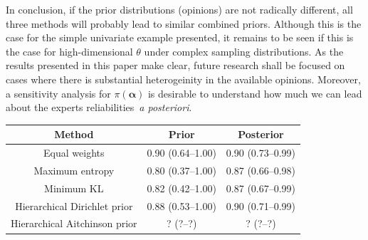 \documentclass[a4paper, notitlepage, 10pt]{article}
\begin{document}
In conclusion, if the prior distributions (opinions) are not radically different, all three methods will probably lead to similar combined priors.
Although this is the case for the simple univariate example presented, it remains to be seen if this is the case for high-dimensional $\theta$ under complex sampling distributions.
As the results presented in this paper make clear, future research shall be focused on cases where there is substantial heterogeinity in the available opinions.
Moreover, a sensitivity analysis for $\pi(\boldsymbol\alpha)$ is desirable to understand how much we can lead about the experts reliabilities~\textit{a posteriori}.



\begin{table}[ht]
\centering
\begin{tabular}{ccc}
 \hline
Method & Prior & Posterior  \\ 
 \hline
 Equal weights & 0.90 (0.64--1.00) & 0.90 (0.73--0.99) \\ 
 Maximum entropy & 0.80 (0.37--1.00) & 0.87 (0.66--0.98) \\ 
 Minimum KL  & 0.82 (0.42--1.00) & 0.87 (0.67--0.99) \\ 
 Hierarchical Dirichlet prior & 0.88 (0.53--1.00) & 0.90 (0.71--0.99) \\ 
 Hierarchical Aitchinson prior & ? (?--?) & ? (?--?) \\ 
  \hline
\end{tabular}
\label{tab:prior_posteriorsBeta}
\end{table}





\end{document}
